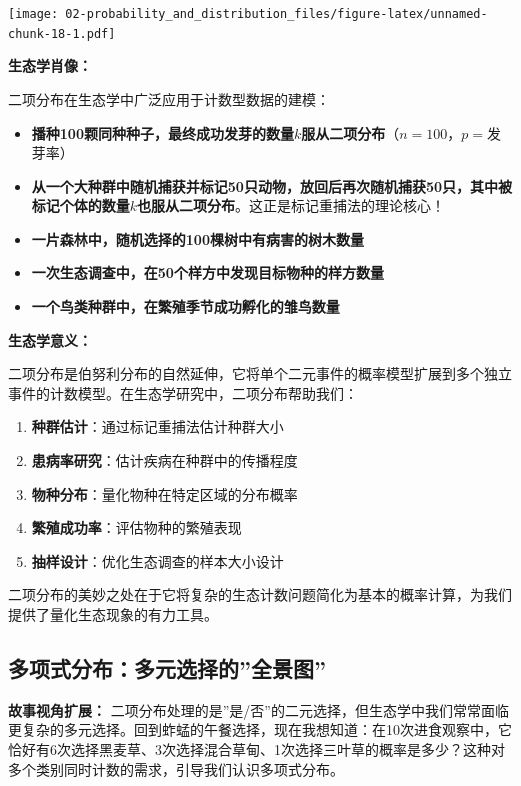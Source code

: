 \documentclass[
  twoside]{book}
\providecommand{\tightlist}{%
  \setlength{\itemsep}{0pt}\setlength{\parskip}{0pt}}
\begin{document}
\texttt{[image: 02-probability\_and\_distribution\_files/figure-latex/unnamed-chunk-18-1.pdf]}

\textbf{生态学肖像：}

二项分布在生态学中广泛应用于计数型数据的建模：

\begin{itemize}
\tightlist
\item
  \textbf{播种100颗同种种子，最终成功发芽的数量\(k\)服从二项分布}（\(n=100\)，\(p=\)发芽率）
\item
  \textbf{从一个大种群中随机捕获并标记50只动物，放回后再次随机捕获50只，其中被标记个体的数量\(k\)也服从二项分布}。这正是标记重捕法的理论核心！
\item
  \textbf{一片森林中，随机选择的100棵树中有病害的树木数量}
\item
  \textbf{一次生态调查中，在50个样方中发现目标物种的样方数量}
\item
  \textbf{一个鸟类种群中，在繁殖季节成功孵化的雏鸟数量}
\end{itemize}

\textbf{生态学意义：}

二项分布是伯努利分布的自然延伸，它将单个二元事件的概率模型扩展到多个独立事件的计数模型。在生态学研究中，二项分布帮助我们：

\begin{enumerate}
\def\labelenumi{\arabic{enumi}.}
\tightlist
\item
  \textbf{种群估计}：通过标记重捕法估计种群大小
\item
  \textbf{患病率研究}：估计疾病在种群中的传播程度
\item
  \textbf{物种分布}：量化物种在特定区域的分布概率
\item
  \textbf{繁殖成功率}：评估物种的繁殖表现
\item
  \textbf{抽样设计}：优化生态调查的样本大小设计
\end{enumerate}

二项分布的美妙之处在于它将复杂的生态计数问题简化为基本的概率计算，为我们提供了量化生态现象的有力工具。

\hypertarget{ux591aux9879ux5f0fux5206ux5e03ux591aux5143ux9009ux62e9ux7684ux5168ux666fux56fe}{%
\subsection{多项式分布：多元选择的''全景图''}\label{ux591aux9879ux5f0fux5206ux5e03ux591aux5143ux9009ux62e9ux7684ux5168ux666fux56fe}}

\textbf{故事视角扩展：} 二项分布处理的是''是/否''的二元选择，但生态学中我们常常面临更复杂的多元选择。回到蚱蜢的午餐选择，现在我想知道：在10次进食观察中，它恰好有6次选择黑麦草、3次选择混合草甸、1次选择三叶草的概率是多少？这种对多个类别同时计数的需求，引导我们认识多项式分布。
\end{document}
